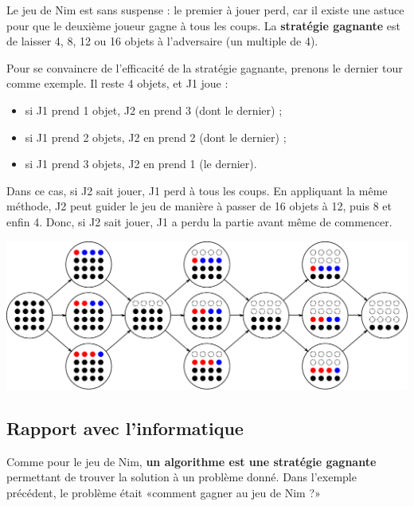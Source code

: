 \documentclass[a5paper,pagesize,DIV=14]{scrbook}
\begin{document}
Le jeu de Nim est sans suspense : le premier à jouer perd, car il existe une astuce pour que le deuxième joueur gagne à tous les coups. La \textbf{stratégie gagnante} est de laisser 4, 8, 12 ou 16 objets à l'adversaire (un multiple de 4).

Pour se convaincre de l'efficacité de la stratégie gagnante, prenons le dernier tour comme exemple. Il reste 4 objets, et J1 joue :

\begin{itemize}
  \item si J1 prend 1 objet, J2 en prend 3 (dont le dernier) ;
  \item si J1 prend 2 objets, J2 en prend 2 (dont le dernier) ;
  \item si J1 prend 3 objets, J2 en prend 1 (le dernier).
\end{itemize}        

Dans ce cas, si J2 sait jouer, J1 perd à tous les coups. En appliquant la même méthode, J2 peut guider le jeu de manière à passer de 16 objets à 12, puis 8 et enfin 4. Donc, si J2 sait jouer, J1 a perdu la partie avant même de commencer.

\begin{center}
  \includegraphics[width=\linewidth]{img/nim16.pdf}
\end{center}

\subsection*{Rapport avec l'informatique}

Comme pour le jeu de Nim, \textbf{un algorithme est une stratégie gagnante} permettant de trouver la solution à un problème donné. Dans l'exemple précédent, le problème était «comment gagner au jeu de Nim ?»

\end{document}
